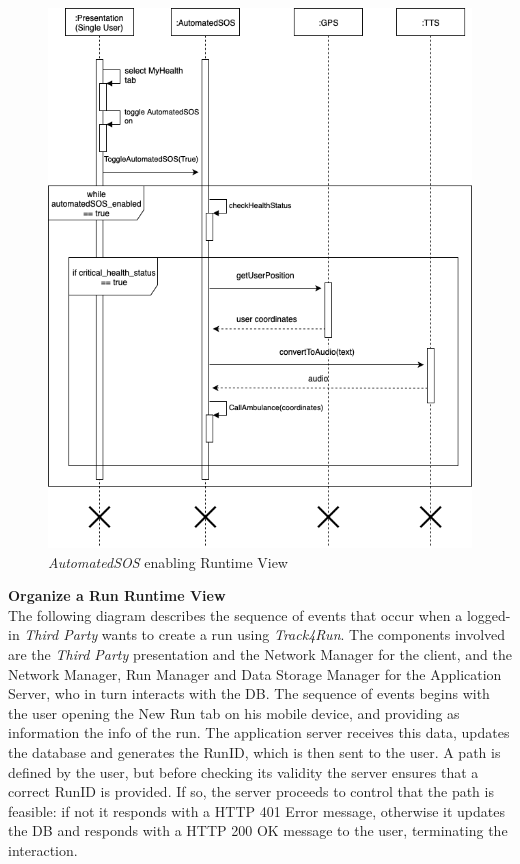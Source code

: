 \documentclass[titlepage]{article}
\begin{document}
\begin{figure}[H]
	\center
  	\includegraphics[width=13cm]{SOS.png}
  	\caption{{\it AutomatedSOS} enabling Runtime View}
 	\label{fig:SOS}
\end{figure}
\noindent
{\bf Organize a Run Runtime View }\\ 
The following diagram describes the sequence of events that occur when a logged-in {\it Third Party} wants to create a run using {\it Track4Run}.
The components involved are the {\it Third Party} presentation and the Network Manager for the client, and the Network Manager, Run Manager and Data Storage Manager for the Application Server, who in turn interacts with the DB.
The sequence of events begins with the user opening the New Run tab on his mobile device, and providing as information the info of the run. The application server receives this data, updates the database and generates the RunID, which is then sent to the user. A path is defined by the user, but before checking its validity the server ensures that a correct RunID is provided. If so, the server proceeds to control that the path is feasible: if not it responds with a HTTP 401 Error message, otherwise it updates the DB and responds with a HTTP 200 OK message to the user, terminating the interaction.
\end{document}
